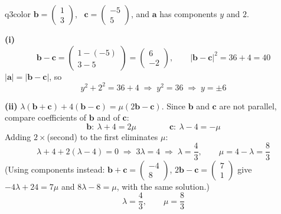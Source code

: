 \documentclass[11pt,a4paper]{article}
\begin{document}
\begin{ansbox}{q3color}
$\mathbf{b}=\begin{pmatrix}1\\3\end{pmatrix}$, \ $\mathbf{c}=\begin{pmatrix}-5\\5\end{pmatrix}$, and $\mathbf{a}$ has components $y$ and $2$.

\textbf{(i)}
\[ \mathbf{b}-\mathbf{c}=\begin{pmatrix}1-(-5)\\3-5\end{pmatrix}=\begin{pmatrix}6\\-2\end{pmatrix},\qquad |\mathbf{b}-\mathbf{c}|^2=36+4=40 \]
$|\mathbf{a}|=|\mathbf{b}-\mathbf{c}|$, so
\[ y^2+2^2=36+4 \;\Rightarrow\; y^2=36 \;\Rightarrow\; \boxed{y=\pm 6} \]

\textbf{(ii)} $\lambda(\mathbf{b}+\mathbf{c})+4(\mathbf{b}-\mathbf{c})=\mu(2\mathbf{b}-\mathbf{c})$. Since $\mathbf{b}$ and $\mathbf{c}$ are not parallel, compare coefficients of $\mathbf{b}$ and of $\mathbf{c}$:
\[ \mathbf{b}:\ \lambda+4=2\mu \qquad\qquad \mathbf{c}:\ \lambda-4=-\mu \]
Adding $2\times$(second) to the first eliminates $\mu$:
\[ \lambda+4+2(\lambda-4)=0 \;\Rightarrow\; 3\lambda=4 \;\Rightarrow\; \lambda=\frac{4}{3},\qquad \mu=4-\lambda=\frac{8}{3} \]
(Using components instead: $\mathbf{b}+\mathbf{c}=\begin{pmatrix}-4\\8\end{pmatrix}$, $2\mathbf{b}-\mathbf{c}=\begin{pmatrix}7\\1\end{pmatrix}$ give $-4\lambda+24=7\mu$ and $8\lambda-8=\mu$, with the same solution.)
\[ \boxed{\lambda=\frac{4}{3},\qquad \mu=\frac{8}{3}} \]
\end{ansbox}
\end{document}
